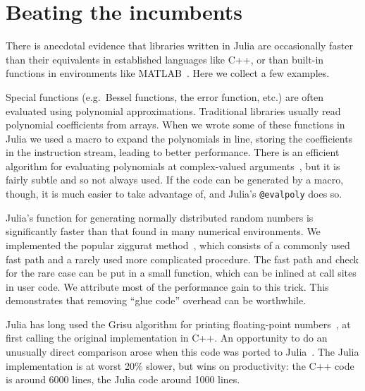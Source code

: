 \section{Beating the incumbents}
\label{sec:beating}

There is anecdotal evidence that libraries written in Julia are occasionally
faster than their equivalents in established languages like C++, or
than built-in functions in environments like MATLAB~\cite{matlab}.
Here we collect a few examples.

Special functions (e.g.\ Bessel functions, the error function, etc.) are
often evaluated using polynomial approximations.
Traditional libraries usually read polynomial coefficients from arrays.
When we wrote some of these functions in Julia we used a macro
to expand the polynomials in line, storing the coefficients in the
instruction stream, leading to better performance.
There is an efficient algorithm for evaluating polynomials at complex-valued
arguments~\cite{knuth1969art}, but it is fairly subtle and so not always
used.
If the code can be generated by a macro, though, it is much easier to take
advantage of, and Julia's \texttt{@evalpoly} does so.


Julia's function for generating normally distributed random numbers is
significantly faster than that found in many numerical environments.
We implemented the popular ziggurat method~\cite{Marsaglia:Tsang:2000:JSSOBK:v05i08},
which consists of a commonly used fast path and a rarely used more complicated
procedure.
The fast path and check for the rare case can be put in a small function,
which can be inlined at call sites in user code.
We attribute most of the performance gain to this trick.
This demonstrates that removing ``glue code'' overhead can be worthwhile.

Julia has long used the Grisu algorithm for printing floating-point
numbers~\cite{Loitsch:2010:PFN:1809028.1806623}, at first calling the
original implementation in C++.
An opportunity to do an unusually direct comparison arose when this
code was ported to Julia~\cite{grisu}.
The Julia implementation is at worst 20\% slower, but wins on
productivity: the C++ code is around 6000 lines, the Julia code
around 1000 lines.
